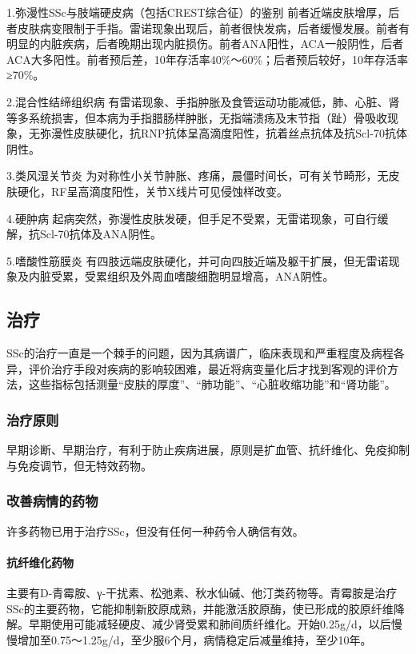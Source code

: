 1.弥漫性SSc与肢端硬皮病（包括CREST综合征）的鉴别
前者近端皮肤增厚，后者皮肤病变限制于手指。雷诺现象出现后，前者很快发病，后者缓慢发展。前者有明显的内脏疾病，后者晚期出现内脏损伤。前者ANA阳性，ACA一般阴性，后者ACA大多阳性。前者预后差，10年存活率40\%～60\%；后者预后较好，10年存活率≥70\%。

2.混合性结缔组织病
有雷诺现象、手指肿胀及食管运动功能减低，肺、心脏、肾等多系统损害，但本病为手指腊肠样肿胀，无指端溃疡及末节指（趾）骨吸收现象，无弥漫性皮肤硬化，抗RNP抗体呈高滴度阳性，抗着丝点抗体及抗Scl-70抗体阴性。

3.类风湿关节炎
为对称性小关节肿胀、疼痛，晨僵时间长，可有关节畸形，无皮肤硬化，RF呈高滴度阳性，关节X线片可见侵蚀样改变。

4.硬肿病
起病突然，弥漫性皮肤发硬，但手足不受累，无雷诺现象，可自行缓解，抗Scl-70抗体及ANA阴性。

5.嗜酸性筋膜炎
有四肢远端皮肤硬化，并可向四肢近端及躯干扩展，但无雷诺现象及内脏受累，受累组织及外周血嗜酸细胞明显增高，ANA阴性。

\subsection{治疗}

SSc的治疗一直是一个棘手的问题，因为其病谱广，临床表现和严重程度及病程各异，评价治疗手段对疾病的影响较困难，最近将病变量化后才找到客观的评价方法，这些指标包括测量“皮肤的厚度”、“肺功能”、“心脏收缩功能”和“肾功能”。

\subsubsection{治疗原则}

早期诊断、早期治疗，有利于防止疾病进展，原则是扩血管、抗纤维化、免疫抑制与免疫调节，但无特效药物。

\subsubsection{改善病情的药物}

许多药物已用于治疗SSc，但没有任何一种药令人确信有效。

\paragraph{抗纤维化药物}

主要有D-青霉胺、γ-干扰素、松弛素、秋水仙碱、他汀类药物等。青霉胺是治疗SSc的主要药物，它能抑制新胶原成熟，并能激活胶原酶，使已形成的胶原纤维降解。早期使用可能减轻硬皮、减少肾受累和肺间质纤维化。开始0.25g/d，以后慢慢增加至0.75～1.25g/d，至少服6个月，病情稳定后减量维持，至少10年。

